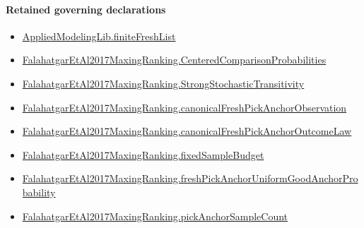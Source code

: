 \documentclass[10pt]{article}
\begin{document}
\paragraph{Retained governing declarations}
\begin{itemize}\raggedright
\item \hyperlink{governing-declaration-9a06ef56935bbfee}{Applied\allowbreak{}Modeling\allowbreak{}Lib.\allowbreak{}finite\allowbreak{}Fresh\allowbreak{}List}
\item \hyperlink{paper-prerequisite-b99b697ef57f53ce}{Falahatgar\allowbreak{}Et\allowbreak{}Al2017\allowbreak{}Maxing\allowbreak{}Ranking.\allowbreak{}Centered\allowbreak{}Comparison\allowbreak{}Probabilities}
\item \hyperlink{paper-prerequisite-76807884cf8ad345}{Falahatgar\allowbreak{}Et\allowbreak{}Al2017\allowbreak{}Maxing\allowbreak{}Ranking.\allowbreak{}Strong\allowbreak{}Stochastic\allowbreak{}Transitivity}
\item \hyperlink{governing-declaration-5242cfba505dfd35}{Falahatgar\allowbreak{}Et\allowbreak{}Al2017\allowbreak{}Maxing\allowbreak{}Ranking.\allowbreak{}canonical\allowbreak{}Fresh\allowbreak{}Pick\allowbreak{}Anchor\allowbreak{}Observation}
\item \hyperlink{paper-prerequisite-10aa11ff14485756}{Falahatgar\allowbreak{}Et\allowbreak{}Al2017\allowbreak{}Maxing\allowbreak{}Ranking.\allowbreak{}canonical\allowbreak{}Fresh\allowbreak{}Pick\allowbreak{}Anchor\allowbreak{}Outcome\allowbreak{}Law}
\item \hyperlink{governing-declaration-4b4daf4bb2493573}{Falahatgar\allowbreak{}Et\allowbreak{}Al2017\allowbreak{}Maxing\allowbreak{}Ranking.\allowbreak{}fixed\allowbreak{}Sample\allowbreak{}Budget}
\item \hyperlink{governing-declaration-ee8355befa583e17}{Falahatgar\allowbreak{}Et\allowbreak{}Al2017\allowbreak{}Maxing\allowbreak{}Ranking.\allowbreak{}fresh\allowbreak{}Pick\allowbreak{}Anchor\allowbreak{}Uniform\allowbreak{}Good\allowbreak{}Anchor\allowbreak{}Probability}
\item \hyperlink{governing-declaration-bfa3394b0e992f22}{Falahatgar\allowbreak{}Et\allowbreak{}Al2017\allowbreak{}Maxing\allowbreak{}Ranking.\allowbreak{}pick\allowbreak{}Anchor\allowbreak{}Sample\allowbreak{}Count}
\end{itemize}
\end{document}
